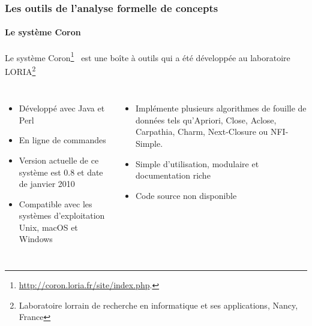 \documentclass[french]{beamer}
\begin{document}
\begin{frame}
\frametitle{Les outils de l'analyse formelle de concepts}
\framesubtitle{Le système Coron}
Le système Coron\footnote{\url{http://coron.loria.fr/site/index.php}.}~\parencite{Szathmary2006} est une boîte à outils qui a été développée au laboratoire LORIA\footnote{Laboratoire lorrain de recherche en informatique et ses applications, Nancy, France} 
\begin{columns}[t]
\begin{itemize}
\item Développé avec Java et Perl
\item En ligne de commandes
\item Version actuelle de ce système est 0.8 et date de janvier 2010
\item Compatible avec les systèmes d'exploitation Unix, macOS et Windows
\end{itemize}
\begin{itemize}
\item Implémente plusieurs algorithmes de fouille de données tels qu'Apriori, Close, Aclose, Carpathia, Charm, Next-Closure ou NFI-Simple.
\item Simple d'utilisation, modulaire et documentation riche
\item Code source non disponible
\end{itemize}
\end{columns}
\end{frame}
\end{document}
